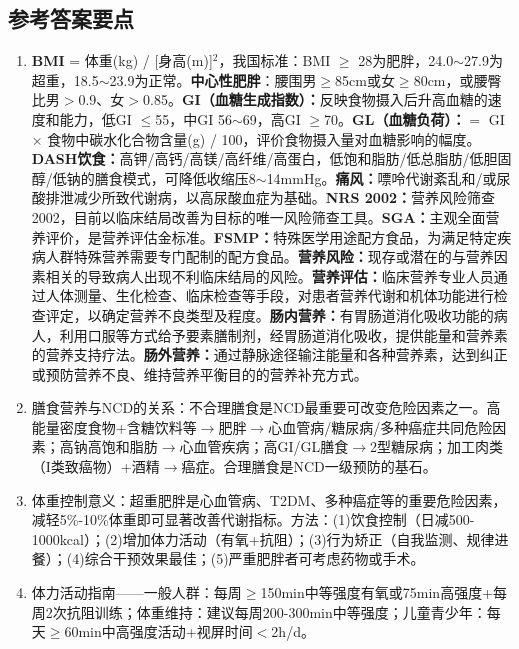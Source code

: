 {\subsection*{参考答案要点}
\begin{enumerate}[leftmargin=*, itemsep=5pt]
    \item \textbf{BMI} = 体重(kg) / [身高(m)]$^2$，我国标准：BMI $\geq$ 28为肥胖，24.0$\sim$27.9为超重，18.5$\sim$23.9为正常。\textbf{中心性肥胖}：腰围男$\geq$85cm或女$\geq$80cm，或腰臀比男$>$0.9、女$>$0.85。\textbf{GI（血糖生成指数）：}反映食物摄入后升高血糖的速度和能力，低GI $\leq$55，中GI 56$\sim$69，高GI $\geq$70。\textbf{GL（血糖负荷）：}$=$ GI $\times$ 食物中碳水化合物含量(g) / 100，评价食物摄入量对血糖影响的幅度。\textbf{DASH饮食：}高钾/高钙/高镁/高纤维/高蛋白，低饱和脂肪/低总脂肪/低胆固醇/低钠的膳食模式，可降低收缩压8$\sim$14mmHg。\textbf{痛风：}嘌呤代谢紊乱和/或尿酸排泄减少所致代谢病，以高尿酸血症为基础。\textbf{NRS 2002：}营养风险筛查2002，目前以临床结局改善为目标的唯一风险筛查工具。\textbf{SGA：}主观全面营养评价，是营养评估金标准。\textbf{FSMP：}特殊医学用途配方食品，为满足特定疾病人群特殊营养需要专门配制的配方食品。\textbf{营养风险：}现存或潜在的与营养因素相关的导致病人出现不利临床结局的风险。\textbf{营养评估：}临床营养专业人员通过人体测量、生化检查、临床检查等手段，对患者营养代谢和机体功能进行检查评定，以确定营养不良类型及程度。\textbf{肠内营养：}有胃肠道消化吸收功能的病人，利用口服等方式给予要素膳制剂，经胃肠道消化吸收，提供能量和营养素的营养支持疗法。\textbf{肠外营养：}通过静脉途径输注能量和各种营养素，达到纠正或预防营养不良、维持营养平衡目的的营养补充方式。

    \item 膳食营养与NCD的关系：不合理膳食是NCD最重要可改变危险因素之一。高能量密度食物+含糖饮料等$\rightarrow$肥胖$\rightarrow$心血管病/糖尿病/多种癌症共同危险因素；高钠高饱和脂肪$\rightarrow$心血管疾病；高GI/GL膳食$\rightarrow$2型糖尿病；加工肉类（I类致癌物）+酒精$\rightarrow$癌症。合理膳食是NCD一级预防的基石。

    \item 体重控制意义：超重肥胖是心血管病、T2DM、多种癌症等的重要危险因素，减轻5\%-10\%体重即可显著改善代谢指标。方法：(1)饮食控制（日减500-1000kcal）；(2)增加体力活动（有氧+抗阻）；(3)行为矫正（自我监测、规律进餐）；(4)综合干预效果最佳；(5)严重肥胖者可考虑药物或手术。

    \item 体力活动指南——一般人群：每周$\ge$150min中等强度有氧或75min高强度+每周2次抗阻训练；体重维持：建议每周200-300min中等强度；儿童青少年：每天$\ge$60min中高强度活动+视屏时间$<$2h/d。


\end{enumerate}}
